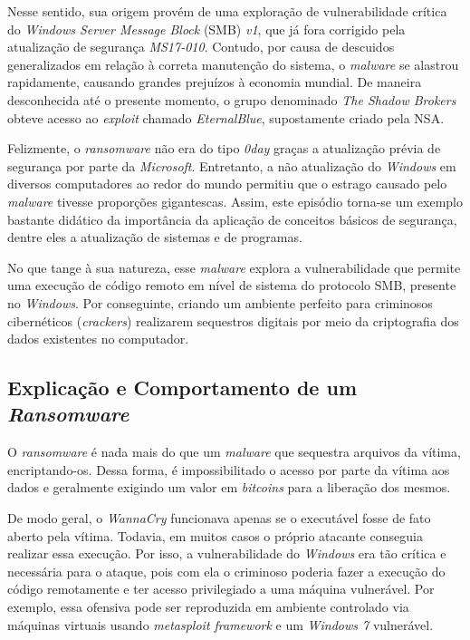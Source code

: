 \documentclass[12pt]{article}
\begin{document}
\noindent
Nesse sentido, sua origem provém de uma exploração de vulnerabilidade crítica do \textit{Windows Server Message Block} (SMB) \textit{v1}, que já fora corrigido pela atualização de segurança \textit{MS17-010}. Contudo, por causa de descuidos generalizados em relação à correta manutenção do sistema, o \textit{malware} se alastrou rapidamente, causando grandes prejuízos à economia mundial. De maneira desconhecida até o presente momento, o grupo denominado \textit{The Shadow Brokers} obteve acesso ao \textit{exploit} chamado \textit{EternalBlue}, supostamente criado pela NSA.

\noindent
Felizmente, o \textit{ransomware} não era do tipo \textit{0day} graças a atualização prévia de segurança por parte da \textit{Microsoft}. Entretanto, a não atualização do \textit{Windows} em diversos computadores ao redor do mundo permitiu que o estrago causado pelo \textit{malware} tivesse proporções gigantescas. Assim, este episódio torna-se um exemplo bastante didático da importância da aplicação de conceitos básicos de segurança, dentre eles a atualização de sistemas e de programas.

\noindent
No que tange à sua natureza, esse \textit{malware} explora a vulnerabilidade que permite uma execução de código remoto em nível de sistema do protocolo SMB, presente no \textit{Windows}. Por conseguinte, criando um ambiente perfeito para criminosos cibernéticos (\textit{crackers}) realizarem sequestros digitais por meio da criptografia dos dados existentes no computador.

\subsection{Explicação e Comportamento de um \textit{Ransomware}}
O \textit{ransomware} é nada mais do que um \textit{malware} que sequestra arquivos da vítima, encriptando-os. Dessa forma, é impossibilitado o acesso por parte da vítima aos dados e geralmente exigindo um valor em \textit{bitcoins} para a liberação dos mesmos.

\noindent
De modo geral, o \textit{WannaCry} funcionava apenas se o executável fosse de fato aberto pela vítima. Todavia, em muitos casos o próprio atacante conseguia realizar essa execução. Por isso, a vulnerabilidade do \textit{Windows} era tão crítica e necessária para o ataque, pois com ela o criminoso poderia fazer a execução do código remotamente e ter acesso privilegiado a uma máquina vulnerável. Por exemplo, essa ofensiva pode ser reproduzida em ambiente controlado via máquinas virtuais usando \textit{metasploit framework} e um \textit{Windows 7} vulnerável.
\end{document}
